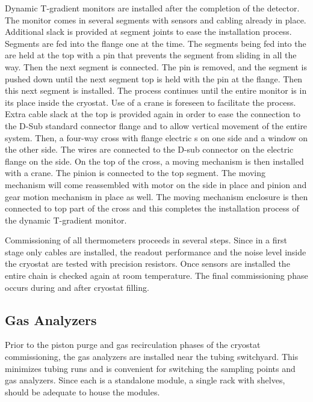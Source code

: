 Dynamic T-gradient monitors are installed after the completion of the detector.
The monitor comes in several segments with sensors and cabling already
in place. Additional slack is provided at segment joints to ease the
installation process. Segments are fed into the flange one at the
time. The segments being fed into the  are held at the top
with a pin that prevents the segment from sliding in all the way. Then the next
segment is connected. The pin is removed, and the
segment is pushed down until the next segment top is held with the
pin at the flange. Then this next segment is installed. The
process  continues until the entire monitor is in its place
inside the cryostat. Use of a crane is foreseen to facilitate the process.
Extra cable slack at the top is provided again in order to ease  the
connection to the D-Sub standard connector flange and to allow  vertical movement of the
entire system. Then,  a four-way cross with flange electric \fdth{}s on
one side and a window on the other side. 
The wires are connected to
the D-sub connector on the electric flange \fdth on the side. On the
top of the cross, a moving mechanism is then installed with a crane.
The pinion is connected to the top segment. The moving mechanism will
come reassembled with motor on the side in place and pinion and gear
motion mechanism in place as well. The moving mechanism enclosure  is then connected to top part of the cross and this completes the
installation process of the dynamic T-gradient monitor.

Commissioning of all thermometers proceeds in several steps. Since in a first stage only cables are installed,
the readout performance and the noise level inside the cryostat are
tested with precision resistors. Once sensors are installed the entire chain is checked again at room temperature.
The final commissioning phase occurs during and after cryostat filling.  


\subsection{Gas Analyzers}
\label{sec:fdgen-slow-cryo-install-ga}
 
Prior to the piston purge and gas recirculation phases of the cryostat commissioning, the gas analyzers are installed near the %
tubing switchyard. This minimizes tubing runs and is  convenient for switching the sampling points and gas analyzers. Since each is a standalone module, a single rack with shelves, should be adequate to house the modules.

